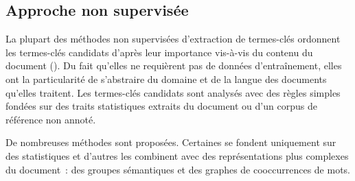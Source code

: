     \subsection{Approche non supervisée}
    \label{subsec:main-state_of_the_art-automatic_keyphrase_extraction-unsupervised_keyphrase_extraction}
      La plupart des méthodes non supervisées d'extraction de termes-clés
      ordonnent les termes-clés candidats d'après leur importance vis-à-vis du
      contenu du document (). Du fait qu'elles
      ne requièrent pas de données d'entraînement, elles ont la particularité de
      s'abstraire du domaine et de la langue des documents qu'elles traitent.
      Les termes-clés candidats sont analysés avec des règles simples fondées
      sur des traits statistiques extraits du document ou d'un corpus de
      référence non annoté.

      De nombreuses méthodes sont proposées. Certaines se fondent uniquement
      sur des statistiques et d'autres les combinent avec des représentations
      plus complexes du document~: des groupes sémantiques et des
      graphes de cooccurrences de mots.

